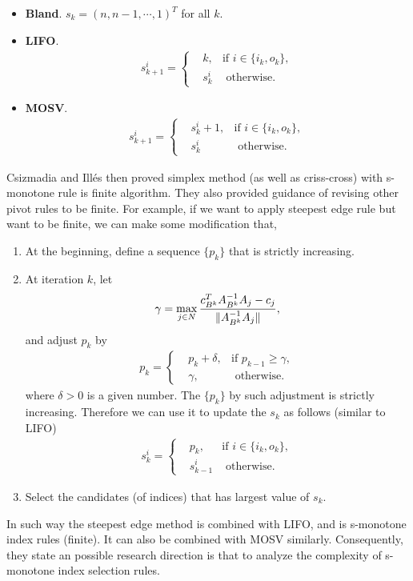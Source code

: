 \documentclass[11pt]{article}
\begin{document}
\begin{itemize}
\item \textbf{Bland}. $s_k = (n, n-1, \cdots, 1)^T$ for all $k$.
\item \textbf{LIFO}. \begin{align*}
s_{k+1}^i = \left\{
\begin{aligned}
&k, & \text{if } i \in \{i_k, o_k\},\\
&s_k^i & \text{ otherwise}. 
\end{aligned}
\right.
\end{align*}
\item \textbf{MOSV}. \begin{align*}
s_{k+1}^i = \left\{
\begin{aligned}
&s_k^{i} + 1, & \text{if } i \in \{i_k, o_k\},\\
&s_k^i & \text{ otherwise}. 
\end{aligned}
\right.
\end{align*}

\end{itemize}
Csizmadia and Illés \cite{csizmadia2012s} then proved simplex method (as well as criss-cross) with s-monotone rule is finite algorithm. They also provided guidance of revising other pivot rules to be finite. For example, if we want to apply steepest edge rule but want to be finite, we can make some modification that, 
\begin{enumerate}
\item At the beginning, define a sequence $\{p_k\}$ that is strictly increasing.
\item At iteration $k$, let
$$
\gamma = \max_{j \in N} \frac{c_{B^k}^TA_{B^k}^{-1}A_j - c_j}{\lVert A_{B^k}^{-1}A_j\rVert},
$$
and adjust $p_k$ by
 \begin{align*}
p_k = \left\{
\begin{aligned}
&p_k + \delta, & \text{if } p_{k-1} \ge \gamma,\\
&\gamma, & \text{ otherwise}. 
\end{aligned}
\right.
\end{align*}
where $\delta > 0$ is a given number. The $\{p_k\}$ by such adjustment is strictly increasing. Therefore we can use it to update the $s_{k}$ as follows (similar to LIFO)
\begin{align*}
s_{k}^i = \left\{
\begin{aligned}
&p_k, & \text{if } i \in \{i_k, o_k\},\\
&s_{k-1}^i & \text{ otherwise}. 
\end{aligned}
\right.
\end{align*}
\item Select the candidates (of indices) that has largest value of $s_k$.
\end{enumerate}
In such way the steepest edge method is combined with LIFO, and is s-monotone index rules (finite). It can also be combined with MOSV similarly. Consequently, they state an possible research direction is that to analyze the complexity of s-monotone index selection rules.
\end{document}

